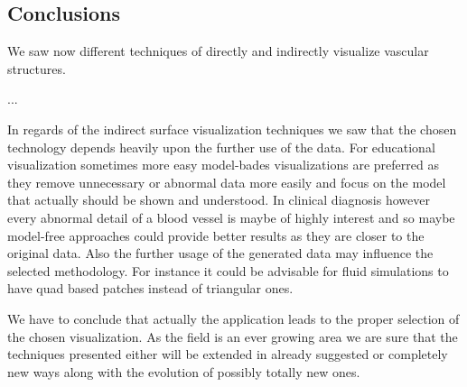\subsection{Conclusions}

We saw now different techniques of directly and indirectly visualize vascular structures. 

...

In regards of the indirect surface visualization techniques we saw that the chosen technology depends heavily upon the further use of the data. For educational visualization sometimes more easy model-bades visualizations are preferred as they remove unnecessary or abnormal data more easily and focus on the model that actually should be shown and understood. In clinical diagnosis however every abnormal detail of a blood vessel is maybe of highly interest and so maybe model-free approaches could provide better results as they are closer to the original data. Also the further usage of the generated data may influence the selected methodology. For instance it could be advisable for fluid simulations to have quad based patches instead of triangular ones.

We have to conclude that actually the application leads to the proper selection of the chosen visualization. 
As the field is an ever growing area we are sure that the techniques presented either will be extended in already suggested or completely new ways along with the evolution of possibly totally new ones. 